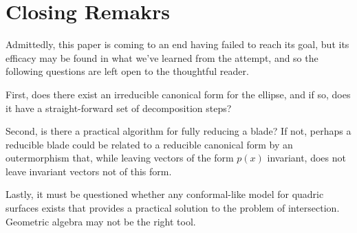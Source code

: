 \documentclass{birkjour}
\theoremstyle{definition}
\theoremstyle{remark}
\numberwithin{equation}{section}
\begin{document}

\section{Closing Remakrs}

Admittedly, this paper is coming to an end having failed to reach its goal,
but its efficacy may be found in what we've learned from the attempt,
and so the following questions are left open to the thoughtful reader.

First, does there exist an irreducible canonical form for the ellipse, and if so,
does it have a straight-forward set of decomposition steps?

Second, is there a practical algorithm for fully reducing a blade?  If not, perhaps
a reducible blade could be related to a reducible canonical form by an outermorphism
that, while leaving vectors of the form $p(x)$ invariant, does not leave invariant
vectors not of this form.

Lastly, it must be questioned whether any conformal-like model for quadric surfaces
exists that provides a practical solution to the problem of intersection.
Geometric algebra may not be the right tool.
\end{document}
